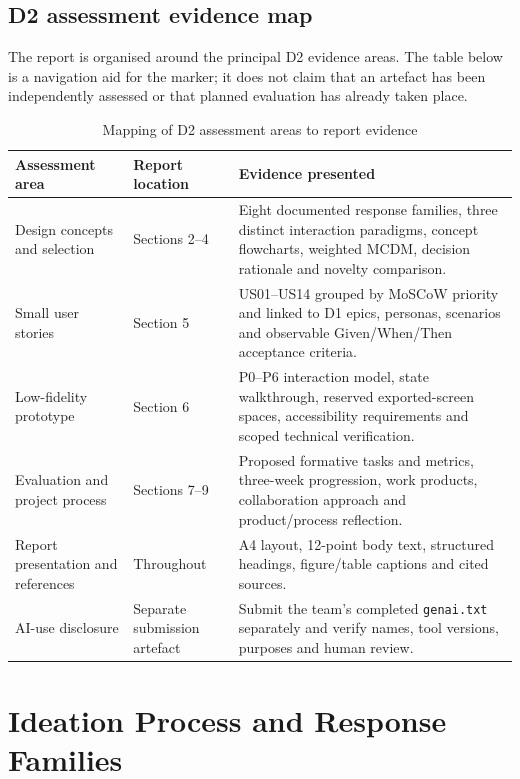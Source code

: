 \documentclass[12pt,a4paper]{article}
\newcommand{\code}[1]{\texttt{#1}}
\begin{document}
\subsection{D2 assessment evidence map}
The report is organised around the principal D2 evidence areas. The table below is a navigation aid for the marker; it does not claim that an artefact has been independently assessed or that planned evaluation has already taken place.

\begin{table}[H]
\centering
\small
\caption{Mapping of D2 assessment areas to report evidence}
\label{tab:assessment-map}
\begin{tabularx}{\textwidth}{@{}>{\raggedright\arraybackslash}p{3.1cm}>{\raggedright\arraybackslash}p{2.6cm}X@{}}
\toprule
\textbf{Assessment area} & \textbf{Report location} & \textbf{Evidence presented}\\
\midrule
Design concepts and selection & Sections 2--4 & Eight documented response families, three distinct interaction paradigms, concept flowcharts, weighted MCDM, decision rationale and novelty comparison.\\
\rowcolor{RowGray}
Small user stories & Section 5 & US01--US14 grouped by MoSCoW priority and linked to D1 epics, personas, scenarios and observable Given/When/Then acceptance criteria.\\
Low-fidelity prototype & Section 6 & P0--P6 interaction model, state walkthrough, reserved exported-screen spaces, accessibility requirements and scoped technical verification.\\
\rowcolor{RowGray}
Evaluation and project process & Sections 7--9 & Proposed formative tasks and metrics, three-week progression, work products, collaboration approach and product/process reflection.\\
Report presentation and references & Throughout & A4 layout, 12-point body text, structured headings, figure/table captions and cited sources.\\
\rowcolor{RowGray}
AI-use disclosure & Separate submission artefact & Submit the team's completed \code{genai.txt} separately and verify names, tool versions, purposes and human review.\\
\bottomrule
\end{tabularx}
\end{table}

\section{Ideation Process and Response Families}
\end{document}
